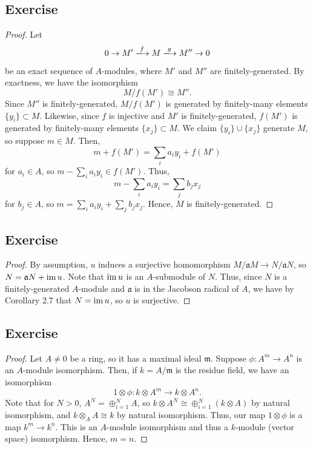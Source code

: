 \subsection{Exercise}\label{2.9} %

\begin{proof}
Let
$$0 \to M' \xlongrightarrow{f} M \xlongrightarrow{g} M'' \to 0$$
be an exact sequence of $A$-modules, where $M'$ and $M''$ are finitely-generated. By exactness, we have the isomorphism
$$M/f(M') \cong M''.$$
Since $M''$ is finitely-generated, $M/f(M')$ is generated by finitely-many elements $\{y_i\} \subset M$. Likewise, since $f$ is injective and $M'$ is finitely-generated, $f(M')$ is 
generated by finitely-many elements $\{x_j\} \subset M$. We claim $\{y_i\} \cup \{x_j\}$ generate $M$, so suppose $m \in M$. Then, 
$$m + f(M') = \sum_i a_i y_i + f(M')$$ 
for $a_i \in A$, so $m - \sum_i a_i y_i \in f(M')$. Thus,
$$m - \sum_i a_i y_i = \sum_j b_j x_j$$
for $b_j \in A$, so $m = \sum_i a_i y_i + \sum_j b_j x_j$. Hence, $M$ is finitely-generated.
\end{proof}

\subsection{Exercise}\label{2.10} %

\begin{proof}
By assumption, $u$ induces a surjective homomorphism $M/\mathfrak{a}M \to N/\mathfrak{a}N$, so $N = \mathfrak{a}N + \operatorname{im} u$. Note that $\operatorname{im} u$ is an $A$-submodule of $N$.
Thus, since $N$ is a finitely-generated $A$-module and $\mathfrak{a}$ is in the Jacobson radical of $A$, we have by Corollary 2.7 that
$N = \operatorname{im} u$, so $u$ is surjective.
\end{proof}

\subsection{Exercise}\label{2.11} %

\begin{proof}
Let $A \neq 0$ be a ring, so it has a maximal ideal $\mathfrak{m}$. Suppose $\phi : A^m \to A^n$ is an $A$-module isomorphism. Then, if $k = A/\mathfrak{m}$ is the residue field, we have an
isomorphism
$$1 \otimes \phi : k \otimes A^m \to k \otimes A^n.$$
Note that for $N > 0$, $A^N = \oplus_{i=1}^N A$, so $k \otimes A^N \cong \oplus_{i=1}^N(k \otimes A)$ by natural isomorphism, and $k \otimes_A A \cong k$ by natural isomorphism. Thus,
our map $1 \otimes \phi$ is a map $k^m \to k^n$. This is an $A$-module isomorphism and thus a $k$-module (vector space) isomorphism. Hence, $m = n$.
\end{proof}

